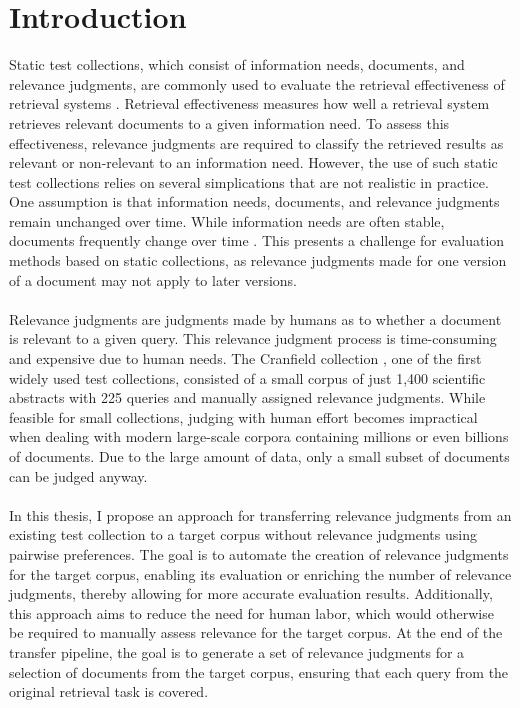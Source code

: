 \chapter{Introduction}\label{introduction} 

Static test collections, which consist of information needs, documents, and relevance judgments, are commonly used to evaluate the retrieval effectiveness of retrieval systems \citep{sanderson:2010}. Retrieval effectiveness measures how well a retrieval system retrieves relevant documents to a given information need. To assess this effectiveness, relevance judgments are required to classify the retrieved results as relevant or non-relevant to an information need. However, the use of such static test collections relies on several simplications that are not realistic in practice. One assumption is that information needs, documents, and relevance judgments remain unchanged over time. While information needs are often stable, documents frequently change over time \citep{cho:2000}. This presents a challenge for evaluation methods based on static collections, as relevance judgments made for one version of a document may not apply to later versions.
\\\\
Relevance judgments are judgments made by humans as to whether a document is relevant to a given query. This relevance judgment process is time-consuming and expensive due to human needs. The Cranfield collection \citep{cleverdon:91}, one of the first widely used test collections, consisted of a small corpus of just 1,400 scientific abstracts with 225 queries and manually assigned relevance judgments. While feasible for small collections, judging with human effort becomes impractical when dealing with modern large-scale corpora containing millions or even billions of documents. Due to the large amount of data, only a small subset of documents can be judged anyway. 
\\\\
In this thesis, I propose an approach for transferring relevance judgments from an existing test collection to a target corpus without relevance judgments using pairwise preferences. The goal is to automate the creation of relevance judgments for the target corpus, enabling its evaluation or enriching the number of relevance judgments, thereby allowing for more accurate evaluation results. Additionally, this approach aims to reduce the need for human labor, which would otherwise be required to manually assess relevance for the target corpus. At the end of the transfer pipeline, the goal is to generate a set of relevance judgments for a selection of documents from the target corpus, ensuring that each query from the original retrieval task is covered.
